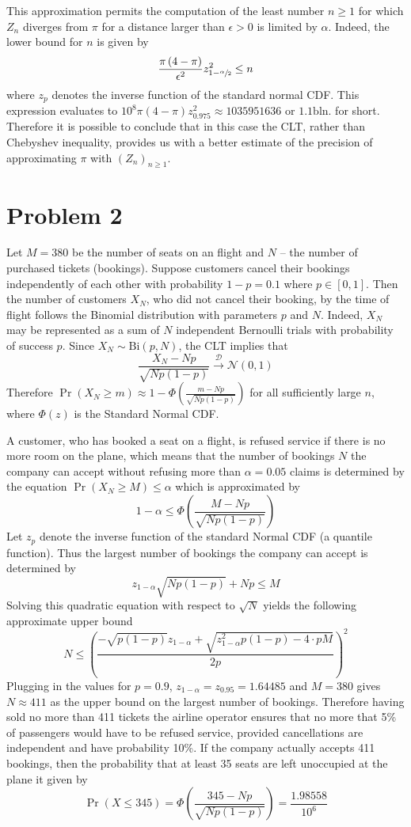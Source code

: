 \documentclass[a4paper]{article}
\newcommand{\clo}[1]{\left [ #1 \right ]}
\newcommand{\brac}[1]{\left ( #1 \right )}
\begin{document}
This approximation permits the computation of the least number $n\geq1$ for which $Z_n$ diverges from $\pi$ for a distance larger than $\epsilon>0$ is limited by $\alpha$. Indeed, the lower bound for $n$ is given by \[\frac{\pi \brac{4-\pi}}{\epsilon^2} z_{1-\sfrac{\alpha}{2}}^2 \leq n\] where $z_p$ denotes the inverse function of the standard normal CDF. This expression evaluates to $10^8 \pi\brac{4-\pi} z_{0.975}^2 \approx 1035951636$ or $1.1 \text{bln.}$ for short. Therefore it is possible to conclude that in this case the CLT, rather than Chebyshev inequality, provides us with a better estimate of the precision of approximating $\pi$ with $\brac{Z_n}_{n\geq1}$.


\section{Problem 2} %
\label{sec:problem_2}

Let $M=380$ be the number of seats on an flight and $N$ -- the number of purchased tickets (bookings). Suppose customers cancel their bookings independently of each other with probability $1-p=0.1$ where $p\in \clo{0,1}$. Then the number of customers $X_N$, who did not cancel their booking, by the time of flight follows the Binomial distribution with parameters $p$ and $N$. Indeed, $X_N$ may be represented as a sum of $N$ independent Bernoulli trials with probability of success $p$. Since $X_N\sim \text{Bi}\brac{p, N}$, the CLT implies that \[\frac{X_N- N p}{\sqrt{N p\brac{1-p}}}\overset{\mathcal{D}}{\to} \mathcal{N}\brac{0,1}\] Therefore $\Pr\brac{X_N\geq m} \approx 1-\Phi\brac{\frac{m-Np}{\sqrt{N p\brac{1-p}}}}$ for all sufficiently large $n$, where $\Phi\brac{z}$ is the Standard Normal CDF.

A customer, who has booked a seat on a flight, is refused service if there is no more room on the plane, which means that the number of bookings $N$ the company can accept without refusing more than $\alpha=0.05$ claims is determined by the equation $\Pr\brac{X_N\geq M} \leq \alpha $ which is approximated by \[1-\alpha\leq \Phi\brac{\frac{M-Np}{\sqrt{N p\brac{1-p}}}}\]
Let $z_p$ denote the inverse function of the standard Normal CDF (a quantile function). Thus the largest number of bookings the company can accept is determined by \[ z_{1-\alpha} \sqrt{N p\brac{1-p}} + N p \leq M \] Solving this quadratic equation with respect to $\sqrt{N}$ yields the following approximate upper bound  \[N \leq \brac{\frac{ -\sqrt{ p\brac{1-p} } z_{1-\alpha} + \sqrt{ z_{1-\alpha}^2 p\brac{1-p} - 4 \cdot p M } }{ 2 p }}^2 \] Plugging in the values for $p=0.9$, $z_{1-\alpha} = z_{0.95} = 1.64485$ and $M=380$ gives $N \approx 411$ as the upper bound on the largest number of bookings. Therefore having sold no more than 411 tickets the airline operator ensures that no more that 5\% of passengers would have to be refused service, provided cancellations are independent and have probability 10\%. If the company actually accepts 411 bookings, then the probability that at least 35 seats are left unoccupied at the plane it given by \[\Pr\brac{X\leq 345}=\Phi\brac{ \frac{345-N p}{\sqrt{N p\brac{1-p}}} } = \frac{1.98558}{10^6}\]
\end{document}
